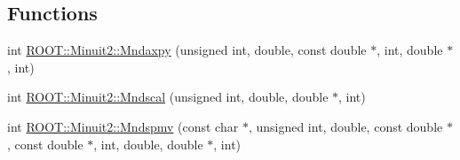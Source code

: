 \subsection*{Functions}
\begin{DoxyCompactItemize}
\item 
int \mbox{\hyperlink{namespaceROOT_1_1Minuit2_a4784db8e0b280e76eb6f8b00e2b395dd}{R\+O\+O\+T\+::\+Minuit2\+::\+Mndaxpy}} (unsigned int, double, const double $\ast$, int, double $\ast$, int)
\item 
int \mbox{\hyperlink{namespaceROOT_1_1Minuit2_a8d430fbbb8b24669bd04e922230451ff}{R\+O\+O\+T\+::\+Minuit2\+::\+Mndscal}} (unsigned int, double, double $\ast$, int)
\item 
int \mbox{\hyperlink{namespaceROOT_1_1Minuit2_ad193f5f7fa4c96ebf1fe98c72ab22ca2}{R\+O\+O\+T\+::\+Minuit2\+::\+Mndspmv}} (const char $\ast$, unsigned int, double, const double $\ast$, const double $\ast$, int, double, double $\ast$, int)
\end{DoxyCompactItemize}
